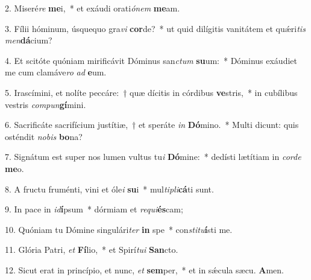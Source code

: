 \item 2. Miseré\textit{re }\textbf{me}i,~* et exáudi orati\textit{ónem} \textbf{me}am.
\item 3. Fílii hóminum, úsquequo gra\textit{vi }\textbf{cor}de?~* ut quid dilígitis vanitátem et quǽri\textit{tis} \textit{men}\textbf{dá}cium?
\item 4. Et scitóte quóniam mirificávit Dóminus san\textit{ctum} \textbf{su}um:~* Dóminus exáudiet me cum clamáve\textit{ro} \textit{ad} \textbf{e}um.
\item 5. Irascímini, et nolíte peccáre:~† quæ dícitis in córdibus \textbf{ve}stris,~* in cubílibus vestris \textit{compun}\textbf{gí}mini.
\item 6. Sacrificáte sacrifícium justítiæ,~† et speráte \textit{in} \textbf{Dó}mino.~* Multi dicunt: quis osténdit \textit{nobis} \textbf{bo}na?
\item 7. Signátum est super nos lumen vultus tu\textit{i} \textbf{Dó}mine:~* dedísti lætítiam in \textit{corde} \textbf{me}o.
\item 8. A fructu fruménti, vini et óle\textit{i} \textbf{su}i~* mul\textit{tipli}\textbf{cá}ti sunt.
\item 9. In pace in \textit{id}\textbf{í}psum~* dórmiam et \textit{requi}\textbf{és}cam;
\item 10. Quóniam tu Dómine singulári\textit{ter} \textbf{in} spe~* con\textit{stitu}\textbf{í}sti me.
\item 11. Glória Patri, \textit{et} \textbf{Fí}lio,~* et Spirí\textit{tui} \textbf{San}cto.
\item 12. Sicut erat in princípio, et nunc, \textit{et} \textbf{sem}per,~* et in sǽcula sæcu\hspace{0.03emlórum}. \textbf{A}men.